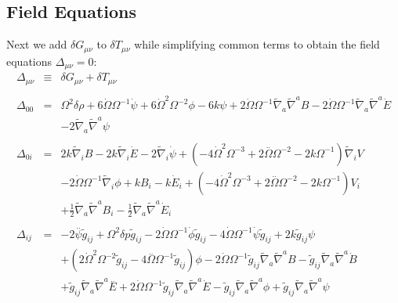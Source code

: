 \subsection{Field Equations}
Next we add $\delta G_{\mu\nu}$ to $\delta T_{\mu\nu}$ while simplifying common terms to obtain the field equations $\Delta_{\mu\nu} = 0$:
\begin{eqnarray}
\Delta_{\mu\nu}&\equiv&\delta G_{\mu\nu} + \delta T_{\mu\nu}
\\ \nonumber\\
\Delta_{00}&=& \Omega^2 \delta \rho + 6 \dot{\Omega} \Omega^{-1} \dot{\psi} + 6 \dot{\Omega}^2 \Omega^{-2} \phi - 6 k \psi + 2 \dot{\Omega} \Omega^{-1} \tilde{\nabla}_{a}\tilde{\nabla}^{a}B - 2 \dot{\Omega} \Omega^{-1} \tilde{\nabla}_{a}\tilde{\nabla}^{a}\dot{E}
\nonumber\\
&& - 2 \tilde{\nabla}_{a}\tilde{\nabla}^{a}\psi 
\\  \nonumber\\ 
\Delta_{0i}&=& 2 k \tilde{\nabla}_{i}B - 2 k \tilde{\nabla}_{i}\dot{E} - 2 \tilde{\nabla}_{i}\dot{\psi} + (-4 \dot{\Omega}^2 \Omega^{-3} + 2 \overset{..}{\Omega} \Omega^{-2} - 2 k \Omega^{-1}) \tilde{\nabla}_{i}V 
\nonumber\\
&&- 2 \dot{\Omega} \Omega^{-1} \tilde{\nabla}_{i}\phi +k B_{i} -  k \dot{E}_{i} + (-4 \dot{\Omega}^2 \Omega^{-3} + 2 \overset{..}{\Omega} \Omega^{-2} - 2 k \Omega^{-1}) V_{i}
\nonumber\\
&& + \tfrac{1}{2} \tilde{\nabla}_{a}\tilde{\nabla}^{a}B_{i} -  \tfrac{1}{2} \tilde{\nabla}_{a}\tilde{\nabla}^{a}\dot{E}_{i}
\\  \nonumber\\ 
\Delta_{ij}&=& -2 \overset{..}{\psi} \tilde{g}_{ij} + \Omega^2 \delta p \tilde{g}_{ij} - 2 \dot{\Omega} \Omega^{-1} \dot{\phi} \tilde{g}_{ij} - 4 \dot{\Omega} \Omega^{-1} \dot{\psi} \tilde{g}_{ij}  + 2 k \tilde{g}_{ij} \psi \nonumber \\ 
&& + (2 \dot{\Omega}^2 \Omega^{-2} \tilde{g}_{ij} - 4 \overset{..}{\Omega} \Omega^{-1} \tilde{g}_{ij}) \phi- 2 \dot{\Omega} \Omega^{-1} \tilde{g}_{ij} \tilde{\nabla}_{a}\tilde{\nabla}^{a}B -  \tilde{g}_{ij} \tilde{\nabla}_{a}\tilde{\nabla}^{a}\dot{B} 
\nonumber\\
&&+ \tilde{g}_{ij} \tilde{\nabla}_{a}\tilde{\nabla}^{a}\overset{..}{E} + 2 \dot{\Omega} \Omega^{-1} \tilde{g}_{ij} \tilde{\nabla}_{a}\tilde{\nabla}^{a}\dot{E} -  \tilde{g}_{ij} \tilde{\nabla}_{a}\tilde{\nabla}^{a}\phi + \tilde{g}_{ij} \tilde{\nabla}_{a}\tilde{\nabla}^{a}\psi 

\end{eqnarray}
